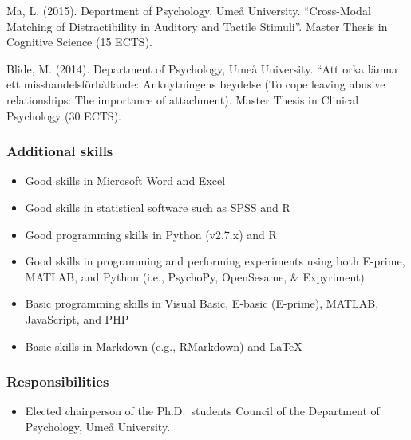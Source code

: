 \documentclass[]{article}
\providecommand{\tightlist}{%
  \setlength{\itemsep}{0pt}\setlength{\parskip}{0pt}}
\begin{document}
Ma, L. (2015). Department of Psychology, Umeå University. ``Cross-Modal
Matching of Distractibility in Auditory and Tactile Stimuli''. Master
Thesis in Cognitive Science (15 ECTS).

Blide, M. (2014). Department of Psychology, Umeå University. ``Att orka
lämna ett misshandelsförhållande: Anknytningens beydelse (To cope
leaving abusive relationships: The importance of attachment). Master
Thesis in Clinical Psychology (30 ECTS).

\subsubsection{Additional skills}\label{additional-skills}

\begin{itemize}
\tightlist
\item
  Good skills in Microsoft Word and Excel
\item
  Good skills in statistical software such as SPSS and R
\item
  Good programming skills in Python (v2.7.x) and R
\item
  Good skills in programming and performing experiments using both
  E-prime, MATLAB, and Python (i.e., PsychoPy, OpenSesame, \&
  Expyriment)
\item
  Basic programming skills in Visual Basic, E-basic (E-prime), MATLAB,
  JavaScript, and PHP
\item
  Basic skills in Markdown (e.g., RMarkdown) and \LaTeX
\end{itemize}

\subsubsection{Responsibilities}\label{responsibilities}

\begin{itemize}
\tightlist
\item
  Elected chairperson of the Ph.D.~students Council of the Department of
  Psychology, Umeå University.
\end{itemize}
\end{document}

